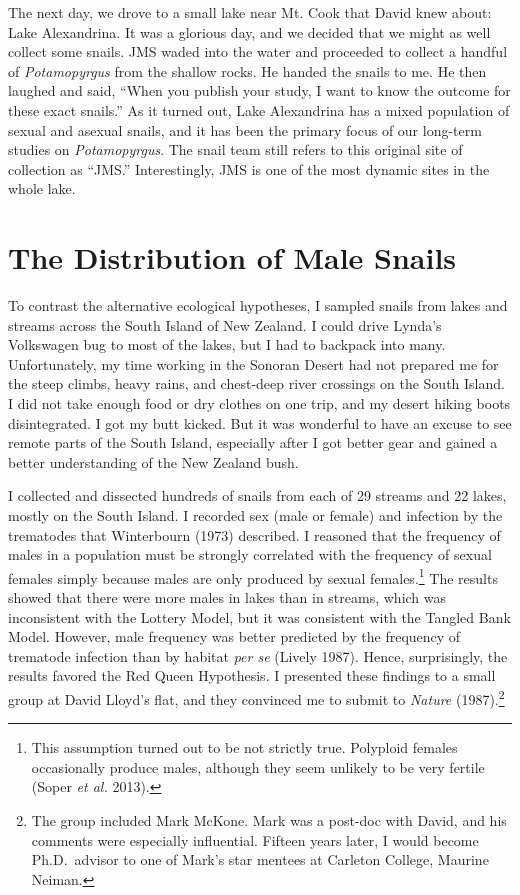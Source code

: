 \documentclass[
  letterpaper,
]{book}
\begin{document}
The next day, we drove to a small lake near Mt. Cook that David knew
about: Lake Alexandrina. It was a glorious day, and we decided that we
might as well collect some snails. JMS waded into the water and
proceeded to collect a handful of \emph{Potamopyrgus} from the shallow
rocks. He handed the snails to me. He then laughed and said, ``When you
publish your study, I want to know the outcome for these exact snails.''
As it turned out, Lake Alexandrina has a mixed population of sexual and
asexual snails, and it has been the primary focus of our long-term
studies on \emph{Potamopyrgus}. The snail team still refers to this
original site of collection as ``JMS.'' Interestingly, JMS is one of the
most dynamic sites in the whole lake.

\section{The Distribution of Male
Snails}\label{the-distribution-of-male-snails}

To contrast the alternative ecological hypotheses, I sampled snails from
lakes and streams across the South Island of New Zealand. I could drive
Lynda's Volkswagen bug to most of the lakes, but I had to backpack into
many. Unfortunately, my time working in the Sonoran Desert had not
prepared me for the steep climbs, heavy rains, and chest-deep river
crossings on the South Island. I did not take enough food or dry clothes
on one trip, and my desert hiking boots disintegrated. I got my butt
kicked. But it was wonderful to have an excuse to see remote parts of
the South Island, especially after I got better gear and gained a better
understanding of the New Zealand bush.

I collected and dissected hundreds of snails from each of 29 streams and
22 lakes, mostly on the South Island. I recorded sex (male or female)
and infection by the trematodes that Winterbourn (1973) described. I
reasoned that the frequency of males in a population must be strongly
correlated with the frequency of sexual females simply because males are
only produced by sexual females.\footnote{This assumption turned out to
  be not strictly true. Polyploid females occasionally produce males,
  although they seem unlikely to be very fertile (Soper \emph{et al.}
  2013).} The results showed that there were more males in lakes than in
streams, which was inconsistent with the Lottery Model, but it was
consistent with the Tangled Bank Model. However, male frequency was
better predicted by the frequency of trematode infection than by habitat
\emph{per se} (Lively 1987). Hence, surprisingly, the results favored
the Red Queen Hypothesis. I presented these findings to a small group at
David Lloyd's flat, and they convinced me to submit to \emph{Nature}
(1987).\footnote{The group included Mark McKone. Mark was a post-doc
  with David, and his comments were especially influential. Fifteen
  years later, I would become Ph.D.~advisor to one of Mark's star
  mentees at Carleton College, Maurine Neiman.}
\end{document}
